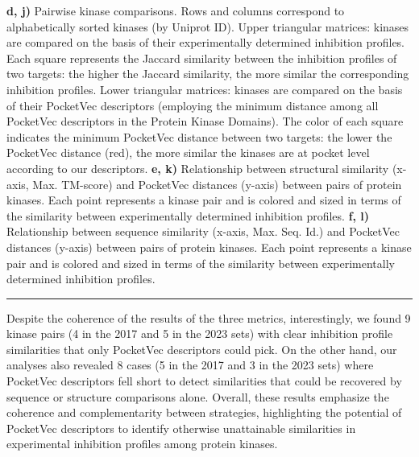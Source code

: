 \begin{Figure_modified}
\begin{center}
{    \textbf{d, j)} Pairwise kinase comparisons. Rows and columns correspond to alphabetically sorted kinases (by Uniprot ID). Upper triangular matrices: kinases are compared on the basis of their experimentally determined inhibition profiles. Each square represents the Jaccard similarity between the inhibition profiles of two targets: the higher the Jaccard similarity, the more similar the corresponding inhibition profiles. Lower triangular matrices: kinases are compared on the basis of their PocketVec descriptors (employing the minimum distance among all PocketVec descriptors in the Protein Kinase Domains). The color of each square indicates the minimum PocketVec distance between two targets: the lower the PocketVec distance (red), the more similar the kinases are at pocket level according to our descriptors.
    \textbf{e, k)} Relationship between structural similarity (x-axis, Max. TM-score) and PocketVec distances (y-axis) between pairs of protein kinases. Each point represents a kinase pair and is colored and sized in terms of the similarity between experimentally determined inhibition profiles.
    \textbf{f, l)} Relationship between sequence similarity (x-axis, Max. Seq. Id.) and PocketVec distances (y-axis) between pairs of protein kinases. Each point represents a kinase pair and is colored and sized in terms of the similarity between experimentally determined inhibition profiles.
 }
  \vspace{-5mm}
  \rule[0ex]{\textwidth}{0.5pt}
  \vspace{-9mm}
 \label{PocketVec_Fig7}
 \end{center}
\end{Figure_modified}

Despite the coherence of the results of the three metrics, interestingly, we found 9 kinase pairs (4 in the 2017 and 5 in the 2023 sets) with clear inhibition profile similarities that only PocketVec descriptors could pick. On the other hand, our analyses also revealed 8 cases (5 in the 2017 and 3 in the 2023 sets) where PocketVec descriptors fell short to detect similarities that could be recovered by sequence or structure comparisons alone. Overall, these results emphasize the coherence and complementarity between strategies, highlighting the potential of PocketVec descriptors to identify otherwise unattainable similarities in experimental inhibition profiles among protein kinases. 